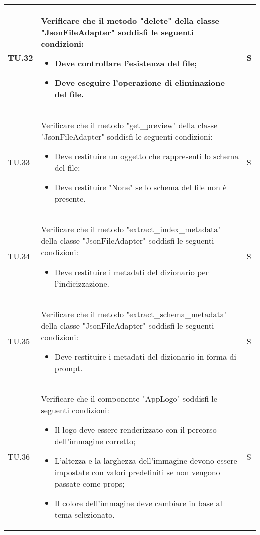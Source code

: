 \begin{adjustwidth}{-0.5cm}{-0.5cm}
\begin{longtable}{|P{1.5cm}|>{\raggedright}P{9.5cm}|>{\arraybackslash}P{1.5cm}|}
		\hline TU.32 & Verificare che il metodo "delete" della classe "JsonFileAdapter" soddisfi le seguenti condizioni:
		\begin{itemize}
			\item Deve controllare l'esistenza del file;
			\item Deve eseguire l'operazione di eliminazione del file.
		\end{itemize} & S \\

		\hline TU.33 & Verificare che il metodo "get\_preview" della classe "JsonFileAdapter" soddisfi le seguenti condizioni:
		\begin{itemize}
			\item Deve restituire un oggetto che rappresenti lo schema del file;
			\item Deve restituire "None" se lo schema del file non è presente.
		\end{itemize} & S \\

		\hline TU.34 & Verificare che il metodo "extract\_index\_metadata" della classe "JsonFileAdapter" soddisfi le seguenti condizioni:
		\begin{itemize}
			\item Deve restituire i metadati del dizionario per l'indicizzazione.
		\end{itemize} & S \\

		\hline TU.35 & Verificare che il metodo "extract\_schema\_metadata" della classe "JsonFileAdapter" soddisfi le seguenti condizioni:
		\begin{itemize}
			\item Deve restituire i metadati del dizionario in forma di prompt.
		\end{itemize} & S \\

		\hline TU.36 & Verificare che il componente "AppLogo" soddisfi le seguenti condizioni:
    \begin{itemize}
      \item Il logo deve essere renderizzato con il percorso dell'immagine corretto;
			\item L'altezza e la larghezza dell'immagine devono essere impostate con valori predefiniti se non vengono passate come props;
			\item Il colore dell'immagine deve cambiare in base al tema selezionato.
    \end{itemize} & S \\


\end{longtable}
\end{adjustwidth}
